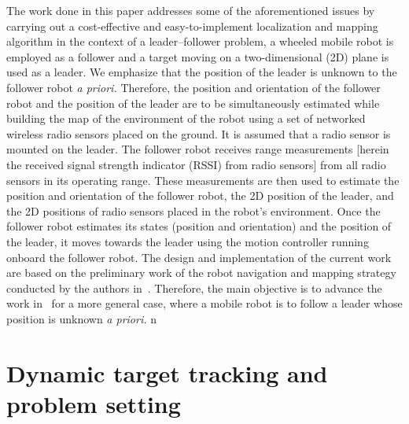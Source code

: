 \documentclass[conference]{IEEEtran}
\begin{document}
The work done in this paper addresses some of the aforementioned issues by carrying out a cost-effective and easy-to-implement localization and mapping algorithm in the context of a leader--follower problem, a wheeled mobile robot is employed as a follower and a target moving on a two-dimensional (2D) plane is used as a leader. We emphasize that the position of the  leader is unknown to the follower robot \emph{a priori.} Therefore, the position and orientation of the follower robot and the position of the leader are to be simultaneously estimated while building the map of the environment of the robot using a set of networked wireless radio sensors placed on the ground. It is assumed that a radio sensor is mounted on the leader. The follower robot receives range measurements [herein the received signal strength indicator (RSSI) from radio sensors] from all radio sensors in its operating range. These measurements are then used to estimate the position and orientation of the follower robot, the 2D position of the leader, and the 2D positions of radio sensors placed in the robot's environment. Once the follower robot estimates its states (position and orientation) and the position of the leader, it moves towards the leader using the motion controller running onboard the follower robot. The design and implementation of the current work are based on the preliminary work of the robot navigation and mapping strategy conducted by the authors in~\cite{HevrdejsKnoll2017-Indoor,KnHeMi2017-c1,HeKnMi2017-c1}. Therefore, the main objective is to advance the work in~\cite{HevrdejsKnoll2017-Indoor,KnHeMi2017-c1,HeKnMi2017-c1} for a more general case, where a mobile robot is to follow a leader  whose position is unknown \emph{a priori.}   
n


\section{Dynamic target tracking and problem setting} 
 \label{sec:problemSetup}
\end{document}

